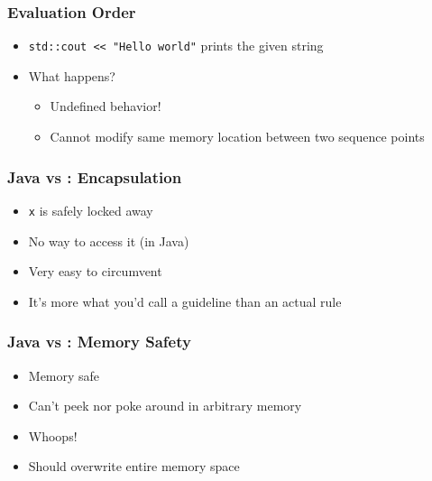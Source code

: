 \begin{frame}
  \frametitle{Evaluation Order}
  \begin{itemize}
    \item \texttt{std::cout {<}< "Hello world"} prints the given string
    \item What happens?
          \begin{itemize}
            \item<2> Undefined behavior!
            \item<2> Cannot modify same memory location between two sequence points
          \end{itemize}
  \end{itemize}
\end{frame}

\begin{frame}
  \frametitle{Java vs \cpp: Encapsulation}
  \begin{itemize}
    \item \texttt{x} is safely locked away
    \item No way to access it (in Java)
  \end{itemize}
  \vskip2mm
  \structure{\cpp}
  \begin{itemize}
    \item Very easy to circumvent
    \item It's more what you'd call a guideline than an actual rule
  \end{itemize}
\end{frame}

\begin{frame}
  \frametitle{Java vs \cpp: Memory Safety}
  \begin{itemize}
    \item Memory safe
    \item Can't peek nor poke around in arbitrary memory
  \end{itemize}
  \vskip2mm
  \structure{\cpp}
  \begin{itemize}
    \item Whoops!
    \item Should overwrite entire memory space
  \end{itemize}
\end{frame}

